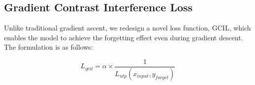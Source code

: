 \documentclass[11pt]{article}
\begin{document}



\subsection{Gradient Contrast Interference Loss}
\label{sec:GCIL}


Unlike traditional gradient ascent, we redesign a novel loss function, GCIL, which enables the model to achieve the forgetting effect even during gradient descent. The formulation is as follows:

\begin{equation}
L_{gcil}=\alpha  \times  \frac{1}{L_{ntp}(x_{input},y_{forget})}
\end{equation}
\end{document}
